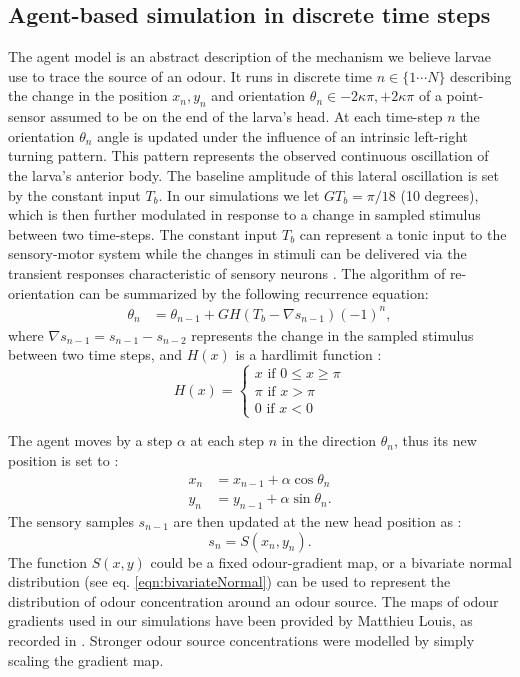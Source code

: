 \documentclass[10pt,a4paper]{article}
\begin{document}
\subsection{Agent-based simulation in discrete time steps}
\label{sec:methodsDiscreteAgent}
The agent model is an abstract description of the mechanism we believe larvae use to trace the source of an odour. It runs in discrete time $n \in \{1 \cdots N\}$ describing the change in the position $x_n,y_n$ and orientation $\theta_n \in {-2 \kappa \pi,+2 \kappa \pi}$ of a point-sensor assumed to be on the end of the larva's head. At each time-step $n$ the orientation $\theta_n$ angle is updated under the influence of an intrinsic left-right turning pattern. This pattern represents the observed continuous oscillation of the larva's anterior body. The baseline amplitude of this lateral oscillation is set by the constant input $T_b$. In our simulations we let $G T_b = \pi/18$ (10 degrees), which is then further modulated in response to a change in sampled stimulus between two time-steps. The constant input $T_b$ can represent a tonic input to the sensory-motor system while the changes in stimuli can be delivered via the transient responses characteristic of sensory neurons \citep{nagel2011biophysical}.
 The algorithm of re-orientation can be summarized by the following recurrence equation:
\begin{align}
\theta_n &= \theta_{n-1} + G H(T_b - \nabla s_{n-1}){(-1)}^n,
\label{eqn:Discretemodel}
\end{align}
where  $\nabla s_{n-1}  = s_{n-1} - s_{n-2}$ represents the change in the sampled stimulus between two time steps, and $H(x)$ is a hardlimit function :
\begin{equation}
H(x) =
\begin{cases}
x \mbox{ if } 0 \leq x \geq \pi \\
\pi \mbox{ if } x > \pi  \\
0 \mbox{ if } x < 0 
\end{cases}
\end{equation}

The agent moves by a step $\alpha$ at each step $n$ in the direction $\theta_n$, thus its new position is set to :
\begin{align}
x_n &= x_{n-1}+ \alpha \cos \theta_{n} \\
y_n &= y_{n-1}+ \alpha  \sin \theta_{n}.
\end{align}
The sensory samples $s_{n-1}$ are then updated at the new head position as :
\begin{equation}
s_n = S(x_n,y_n).
\end{equation}
The function $S(x,y)$ could be a  fixed odour-gradient map, or a bivariate normal distribution (see eq. \eqref{eqn:bivariateNormal}) can be used to represent the distribution of odour concentration around an odour source. 
 The maps of odour gradients used in our simulations have been provided by Matthieu Louis, as recorded in \citep{gomez2014multilevel}. Stronger odour source concentrations were modelled by simply scaling the gradient map. 
\end{document}
